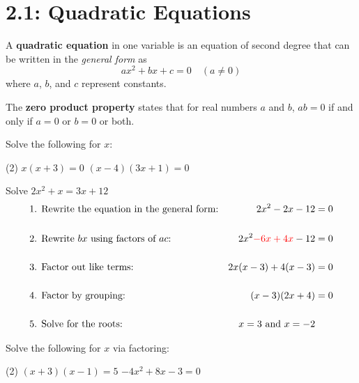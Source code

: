 \documentclass[../mathNotesPreamble]{subfiles}
\providecommand{\relscalefact}{1.4}
\begin{document}
\relscale{\relscalefact}
  \section{2.1: Quadratic Equations}
    \begin{defn*}
      A \textbf{quadratic equation} in one variable is an equation of second degree that can be written in the \emph{general form} as
        \[ax^2+bx+c=0 \quad (a\neq 0)\]
      where $a$, $b$, and $c$ represent constants.
      \vspace*{\baselineskip}

      The \textbf{zero product property} states that for real numbers $a$ and $b$, $ab=0$ if and only if $a=0$ or $b=0$ or both.
    \end{defn*}

    \begin{ex*}
      Solve the following for $x$:
    \end{ex*}
    \begin{extasks}[after-item-skip=\stretch{1}](2)
      \task $x(x+3)=0$
      \task $(x-4)(3x+1)=0$
    \end{extasks}

    \pagebreak
    \begin{thmBox*}
      \begin{ex*}
        Solve $2x^2+x=3x+12$
        \begin{align*}
          &\textnormal{1. Rewrite the equation in the general form:}&
            2x^2-2x-12&=0\\[5mm]
          &\textnormal{2. Rewrite $bx$ using factors of $ac$:}&
            2x^2\textcolor{red}{-6x+4x}-12&=0 \\[5mm]
          &\textnormal{3. Factor out like terms:}&
            2x(x-3)+4(x-3)&=0 \\[5mm]
          &\textnormal{4. Factor by grouping:}&
            (x-3)(2x+4)&=0 \\[5mm]
          &\textnormal{5. Solve for the roots:}&
            x=3 \textnormal{ and } x=-2
        \end{align*}
      \end{ex*}
    \end{thmBox*}

    \begin{ex*}
      Solve the following for $x$ via factoring:
    \end{ex*}
    \begin{extasks}[after-item-skip=\stretch{1}](2)
      \task $(x+3)(x-1)=5$
      \task $-4x^2+8x-3=0$
    \end{extasks}
    \pagebreak
\end{document}
